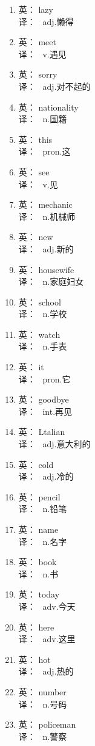 {\begin{multicols}{2}
\begin{enumerate}
\item 英： lazy \\ 译： \ adj.懒得
\item 英： meet \\ 译： \ v.遇见
\item 英： sorry \\ 译： \ adj.对不起的
\item 英： nationality \\ 译： \ n.国籍
\item 英： this \\ 译： \ pron.这
\item 英： see \\ 译： \ v.见
\item 英： mechanic \\ 译： \ n.机械师
\item 英： new \\ 译： \ adj.新的
\item 英： housewife \\ 译： \ n.家庭妇女
\item 英： school \\ 译： \ n.学校
\item 英： watch \\ 译： \ n.手表
\item 英： it \\ 译： \ pron.它
\item 英： goodbye \\ 译： \ int.再见
\item 英： Ltalian \\ 译： \ adj.意大利的
\item 英： cold \\ 译： \ adj.冷的
\item 英： pencil \\ 译： \ n.铅笔
\item 英： name \\ 译： \ n.名字
\item 英： book \\ 译： \ n.书
\item 英： today \\ 译： \ adv.今天
\item 英： here \\ 译： \ adv.这里
\item 英： hot \\ 译： \ adj.热的
\item 英： number \\ 译： \ n.号码
\item 英： policeman \\ 译： \ n.警察

\end{enumerate}
\end{multicols}}
